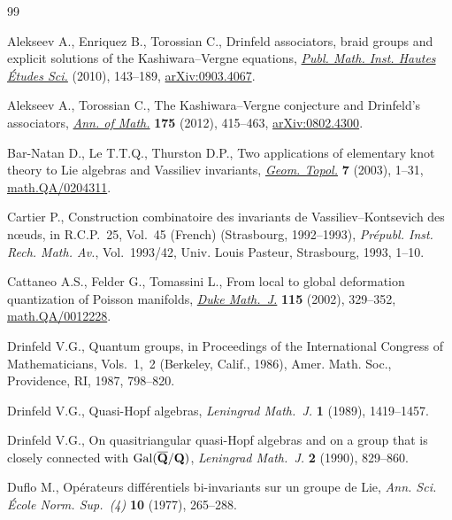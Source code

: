 \begin{thebibliography}{99}
\footnotesize\itemsep=0pt

Alekseev A., Enriquez B., Torossian C., Drinfeld associators, braid groups and
 explicit solutions of the {K}ashiwara--{V}ergne equations, \href{http://dx.doi.org/10.1007/s10240-010-0029-4}{\textit{Publ.
 Math. Inst. Hautes \'Etudes Sci.}} (2010), 143--189, \href{http://arxiv.org/abs/0903.4067}{arXiv:0903.4067}.

Alekseev A., Torossian C., The {K}ashiwara--{V}ergne conjecture and
 {D}rinfeld's associators, \href{http://dx.doi.org/10.4007/annals.2012.175.2.1}{\textit{Ann. of Math.}} \textbf{175} (2012),
 415--463, \href{http://arxiv.org/abs/0802.4300}{arXiv:0802.4300}.

Bar-Natan D., Le T.T.Q., Thurston D.P., Two applications of elementary knot
 theory to {L}ie algebras and {V}assiliev invariants, \href{http://dx.doi.org/10.2140/gt.2003.7.1}{\textit{Geom. Topol.}}
 \textbf{7} (2003), 1--31, \href{http://arxiv.org/abs/math.QA/0204311}{math.QA/0204311}.

Cartier P., Construction combinatoire des invariants de
 {V}assiliev--{K}ontsevich des n\oe uds, in R.{C}.{P}.~25, {V}ol.~45
 ({F}rench) ({S}trasbourg, 1992--1993), \textit{Pr\'epubl. Inst. Rech. Math.
 Av.}, Vol.~1993/42, Univ. Louis Pasteur, Strasbourg, 1993, 1--10.

Cattaneo A.S., Felder G., Tomassini L., From local to global deformation
 quantization of {P}oisson manifolds, \href{http://dx.doi.org/10.1215/S0012-7094-02-11524-5}{\textit{Duke Math.~J.}} \textbf{115}
 (2002), 329--352, \href{http://arxiv.org/abs/math.QA/0012228}{math.QA/0012228}.

Drinfeld V.G., Quantum groups, in Proceedings of the {I}nternational {C}ongress
 of {M}athematicians, {V}ols.~1,~2 ({B}erkeley, {C}alif., 1986), Amer. Math.
 Soc., Providence, RI, 1987, 798--820.

Drinfeld V.G., Quasi-{H}opf algebras, \textit{Leningrad Math.~J.} \textbf{1}
 (1989), 1419--1457.

Drinfeld V.G., On quasitriangular quasi-{H}opf algebras and on a group that is
 closely connected with {${\rm Gal}(\overline{\bf Q}/{\bf Q})$},
 \textit{Leningrad Math.~J.} \textbf{2} (1990), 829--860.

Duf\/lo M., Op\'erateurs dif\/f\'erentiels bi-invariants sur un groupe de {L}ie,
 \textit{Ann. Sci. \'Ecole Norm. Sup.~(4)} \textbf{10} (1977), 265--288.


\end{thebibliography}
